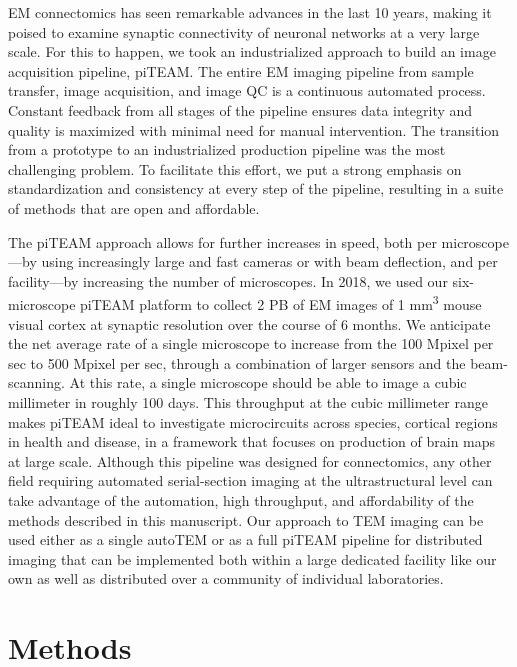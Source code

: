 \documentclass{article}
\begin{document}
EM connectomics has seen remarkable advances in the last 10 years, making it poised to examine synaptic connectivity of neuronal networks at a very large scale. For this to happen, we took an industrialized approach to build an image acquisition pipeline, piTEAM. The entire EM imaging pipeline from sample transfer, image acquisition, and image QC is a continuous automated process. Constant feedback from all stages of the pipeline ensures data integrity and quality is maximized with minimal need for manual intervention. The transition from a prototype to an industrialized production pipeline was the most challenging problem. To facilitate this effort, we put a strong emphasis on standardization and consistency at every step of the pipeline, resulting in a suite of methods that are open and affordable.

The piTEAM approach allows for further increases in speed, both per microscope—by using increasingly large and fast cameras or with beam deflection, and per facility—by increasing the number of microscopes. In 2018, we used our six-microscope piTEAM platform to collect 2 PB of EM images of 1 mm\textsuperscript{3} mouse visual cortex at synaptic resolution over the course of 6 months. We anticipate the net average rate of a single microscope to increase from the 100 Mpixel per sec to 500 Mpixel per sec, through a combination of larger sensors and the beam-scanning. At this rate, a single microscope should be able to image a cubic millimeter in roughly 100 days. This throughput at the cubic millimeter range makes piTEAM ideal to investigate microcircuits across species, cortical regions in health and disease, in a framework that focuses on production of brain maps at large scale. Although this pipeline was designed for connectomics, any other field requiring automated serial-section imaging at the ultrastructural level can take advantage of the automation, high throughput, and affordability of the methods described in this manuscript. Our approach to TEM imaging can be used either as a single autoTEM or as a full piTEAM pipeline for distributed imaging that can be implemented both within a large dedicated facility like our own as well as distributed over a community of individual laboratories.

\section*{Methods}
\end{document}
